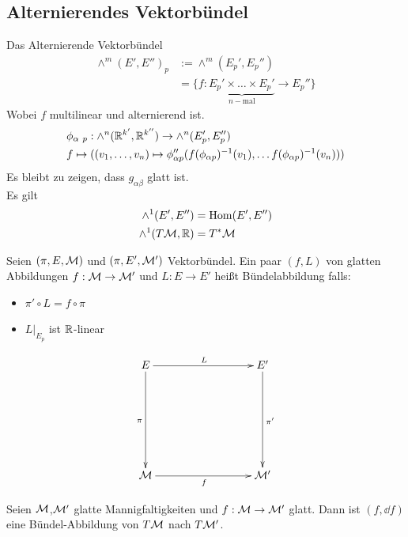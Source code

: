 \subsection{Alternierendes Vektorbündel}
Das Alternierende Vektorbündel
\begin{align}
\wedge^m(E', E'')_p &:= \wedge^m(E_{p}', E_{p}'')\\
&= \{ f: \underbrace{E_{p}' \times \dots \times E_{p}'}_{n-\mathrm{mal}} \to E_{p}'' \}
\end{align}
Wobei $f$ multilinear und alternierend ist. 
\begin{align}
&\phi_{\alpha \ p}: \wedge^n (\mathbb{R}^{k'}, \mathbb{R}^{k''}) \to \wedge^n (E_{p}', E_{p}'')\\
&f \mapsto ((v_1, \dots, v_n) \mapsto \phi_{\alpha p}''( f(\phi_{\alpha p})^{-1} (v_1), \dots f(\phi_{\alpha p})^{-1} (v_n)) )
\end{align}
Es bleibt zu zeigen, dass $g_{\alpha \beta}$ glatt ist.\\
Es gilt 
\begin{align}
\wedge^1 (E', E'') &= \mathrm{Hom}(E', E'')\\
\wedge^1 (T\mathcal{M}, \mathbb{R}) &= T^{*}\mathcal{M}
\end{align}

\begin{defs}
Seien $(\pi, E, \mathcal{M})$ und $(\pi, E', \mathcal{M}')$ Vektorbündel.
Ein paar $(f, L)$ von glatten Abbildungen $f: \mathcal{M} \to \mathcal{M}'$ und $L: E \to E'$ heißt Bündelabbildung falls:
\begin{itemize}
\item $\pi' \circ L = f \circ \pi$
\item $L\big\vert_{E_p}$ ist $\mathbb{R}$-linear
\end{itemize}


\begin{align}
\begin{xy}
  \xymatrix@=0.25\linewidth{
      E \ar[r]^L \ar[d]_\pi    &   E' \ar[d]^{\pi '}  \\
      \mfk \ar[r]_f             &   \mfk'   
  }
\end{xy}
\end{align}


\end{defs}

\begin{bsp}
Seien $\mathcal{M}$,$\mathcal{M}'$ glatte Mannigfaltigkeiten und $f:\mathcal{M} \to \mathcal{M}'$ glatt.
Dann ist $(f, \dd f)$ eine Bündel-Abbildung von $T\mathcal{M}$ nach $T\mathcal{M}'$.
\end{bsp}

